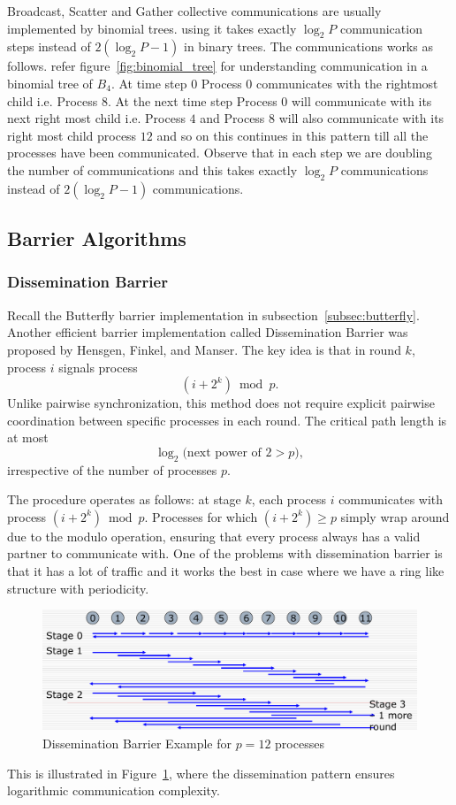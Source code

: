 \documentclass[12pt]{book}
\begin{document}
Broadcast, Scatter and Gather collective communications are usually implemented by binomial trees. using it takes exactly $\log_2 P$ communication steps instead of $2(\log_2 P -1)$ in binary trees. The communications works as follows. refer figure~\ref{fig:binomial_tree} for understanding communication in a binomial tree of $B_4$. At time step $0$ Process $0$ communicates with the rightmost child i.e. Process $8$. At the next time step Process $0$ will communicate with its next right most child i.e. Process $4$ and Process $8$ will also communicate with its right most child process $12$ and so on this continues in this pattern till all the processes have been communicated. Observe that in each step we are doubling the number of communications and this takes exactly $\log_2 P$ communications instead of $2(\log_2 P -1)$ communications.


\subsection{Barrier Algorithms}
\subsubsection{Dissemination Barrier}
Recall the Butterfly barrier implementation in subsection~\ref{subsec:butterfly}. Another efficient barrier implementation called Dissemination Barrier was proposed by Hensgen, Finkel, and Manser. The key idea is that in round $k$, process $i$ signals process 
\[
(i + 2^k) \bmod p.
\]
Unlike pairwise synchronization, this method does not require explicit pairwise coordination between specific processes in each round. The critical path length is at most 
\[
\log_2\bigl(\text{next power of } 2 > p\bigr),
\]
irrespective of the number of processes $p$.

The procedure operates as follows: at stage $k$, each process $i$ communicates with process $(i+2^k) \bmod p$. Processes for which $(i+2^k) \geq p$ simply wrap around due to the modulo operation, ensuring that every process always has a valid partner to communicate with. One of the problems with dissemination barrier is that it has a lot of traffic and it works the best in case where we have a ring like structure with periodicity.
\begin{figure}[ht]
    \centering
    \includegraphics[width=0.75\linewidth]{images/dissemination.png}
    \caption{Dissemination Barrier Example for $p=12$ processes}
    \label{fig:dissemination}
\end{figure}
This is illustrated in Figure~\ref{fig:dissemination}, where the dissemination pattern ensures logarithmic communication complexity.
\end{document}
